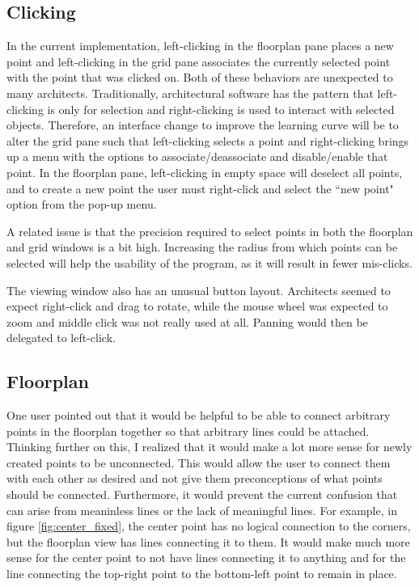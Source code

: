 \documentclass{thesis}
\begin{document}
\subsection{Clicking}
In the current implementation, left-clicking in the floorplan pane places a new point and left-clicking in the grid pane associates
the currently selected point with the point that was clicked on.  Both of these behaviors are unexpected to many architects.
Traditionally, architectural software has the pattern that left-clicking is only for selection and right-clicking is used to interact
with selected objects.  Therefore, an interface change to improve the learning curve will be to alter the grid pane such that
left-clicking selects a point and right-clicking brings up a menu with the options to associate/deassociate and disable/enable that
point.  In the floorplan pane, left-clicking in empty space will deselect all points, and to create a new point the user must
right-click and select the ``new point" option from the pop-up menu.

A related issue is that the precision required to select points in both the floorplan and grid windows is a bit high.  Increasing
the radius from which points can be selected will help the usability of the program, as it will result in fewer mis-clicks.

The viewing window also has an unusual button layout.  Architects seemed to expect right-click and drag to rotate, while the mouse
wheel was expected to zoom and middle click was not really used at all.  Panning would then be delegated to left-click.

\subsection{Floorplan}
One user pointed out that it would be helpful to be able to connect arbitrary points in the floorplan together so that arbitrary
lines could be attached.  Thinking further on this, I realized that it would make a lot more sense for newly created points to be
unconnected.  This would allow the user to connect them with each other as desired and not give them preconceptions of what
points should be connected.  Furthermore, it would prevent the current confusion that can arise from meaninless lines or the
lack of meaningful lines.  For example, in figure \ref{fig:center_fixed}, the center point has no logical connection to the corners,
but the floorplan view has lines connecting it to them.  It would make much more sense for the center point to not have lines
connecting it to anything and for the line connecting the top-right point to the bottom-left point to remain in place.
\end{document}
